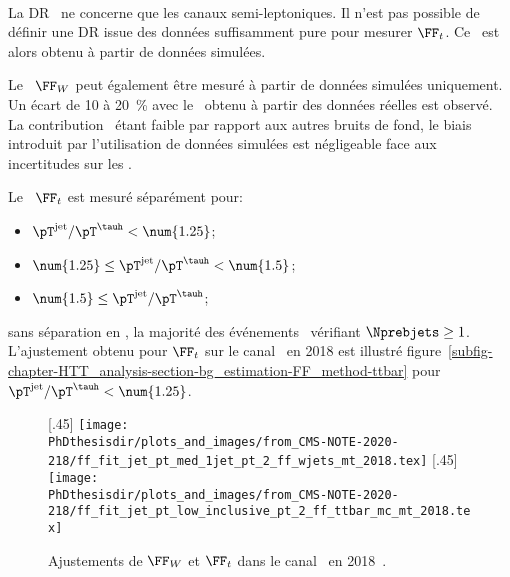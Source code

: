 \paragraph{\ttbar}
La DR \ttbar\ ne concerne que les canaux semi-leptoniques.
Il n'est pas possible de définir une DR issue des données suffisamment pure pour mesurer $\FF_t$.
Ce \fakefactor\ est alors obtenu à partir de données simulées.
\par
Le \fakefactor\ $\FF_W$ peut également être mesuré à partir de données simulées uniquement.
Un écart de \num{10} à \SI{20}{\%} avec le \fakefactor\ obtenu à partir des données réelles est observé.
La contribution \ttbar\ étant faible par rapport aux autres bruits de fond, le biais introduit par l'utilisation de données simulées est négligeable face aux incertitudes sur les \fakefactors.
\par
Le \fakefactor\ $\FF_t$ est mesuré séparément pour:
\begin{itemize}
\item $\pT^\text{jet}/\pT^{\tauh} < \num{1.25}$;
\item $\num{1.25} \leq \pT^\text{jet}/\pT^{\tauh} < \num{1.5}$;
\item $\num{1.5} \leq \pT^\text{jet}/\pT^{\tauh}$;
\end{itemize}
sans séparation en \Nprebjets, la majorité des événements \ttbar\ vérifiant $\Nprebjets\geq1$.
L'ajustement obtenu pour $\FF_t$ sur le canal \mu\tauh\ en 2018 est illustré figure~\ref{subfig-chapter-HTT_analysis-section-bg_estimation-FF_method-ttbar} pour $\pT^\text{jet}/\pT^{\tauh} < \num{1.25}$.
\begin{figure}[h]
\centering

[.45\textwidth]
{\texttt{[image: \\PhDthesisdir/plots\_and\_images/from\_CMS-NOTE-2020-218/ff\_fit\_jet\_pt\_med\_1jet\_pt\_2\_ff\_wjets\_mt\_2018.tex]}}
\hfill
{}[.45\textwidth]
{\texttt{[image: \\PhDthesisdir/plots\_and\_images/from\_CMS-NOTE-2020-218/ff\_fit\_jet\_pt\_low\_inclusive\_pt\_2\_ff\_ttbar\_mc\_mt\_2018.tex]}}

\caption[Ajustements de $\FF_W$ et $\FF_t$ dans le canal \mu\tauh\ en 2018.]{Ajustements de $\FF_W$ et $\FF_t$ dans le canal \mu\tauh\ en 2018~\cite{CMS-NOTE-2020-218}.}
\label{fig-chapter-HTT_analysis-section-bg_estimation-FF_method-WJ-ttbar}
\end{figure}
